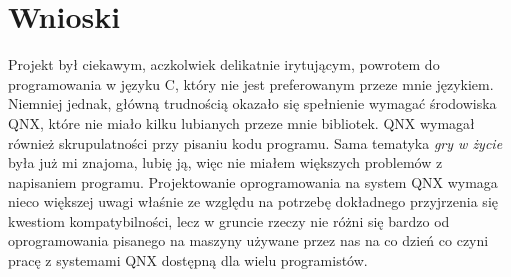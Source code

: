 \documentclass[a4paper,11pt]{article}
\begin{document}
\section{Wnioski}
Projekt był ciekawym, aczkolwiek delikatnie irytującym, powrotem do programowania w języku C, który nie jest preferowanym przeze mnie językiem. Niemniej jednak, główną trudnością okazało się spełnienie wymagać środowiska QNX, które nie miało kilku lubianych przeze mnie bibliotek. QNX wymagał również skrupulatności przy pisaniu kodu programu. Sama tematyka \textit{gry w życie} była już mi znajoma, lubię ją, więc nie miałem większych problemów z napisaniem programu. Projektowanie oprogramowania na system QNX wymaga nieco większej uwagi właśnie ze względu na potrzebę dokładnego przyjrzenia się kwestiom kompatybilności, lecz w gruncie rzeczy nie różni się bardzo od oprogramowania pisanego na maszyny używane przez nas na co dzień co czyni pracę z systemami QNX dostępną dla wielu programistów.
\end{document}
